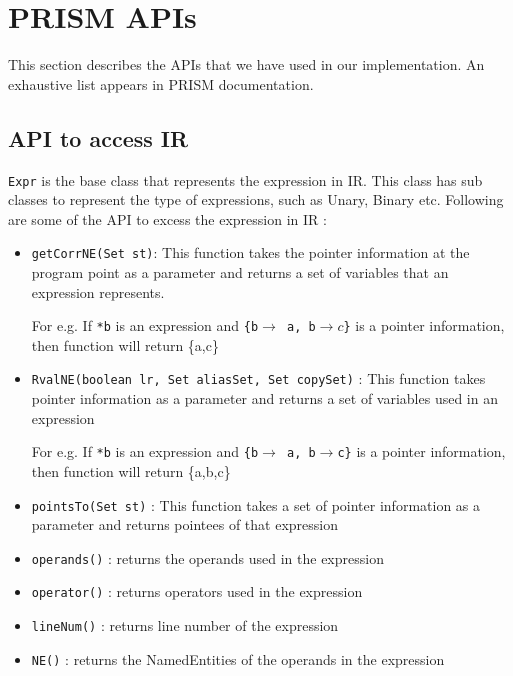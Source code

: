 \documentclass[11pt,a4paper,openright]{report}
\begin{document}
 
 
 
 
 
\chapter{PRISM APIs}\label{ap:B}

This section describes the APIs that we have used in our implementation. An exhaustive list appears in PRISM documentation.

\section{API to access IR}
\texttt{Expr} is the base class that represents the expression in IR. This class has sub classes to represent the type of expressions, such as Unary, Binary etc.
Following are some of the API to excess the expression in IR :
\begin{itemize}
 \item \texttt{getCorrNE(Set st)}: This function takes the pointer information at the program point as a parameter and returns a set of variables that an expression represents.
 
 For e.g. If \texttt{*b} is an expression and \texttt{\{b$\rightarrow$ a, b$\rightarrow c$\}} is a pointer information, then function will return \{a,c\}
 
 \item \texttt{RvalNE(boolean lr, Set aliasSet, Set copySet)} : This function takes pointer information as a parameter and returns a set of variables used in an expression
 
 For e.g. If \texttt{*b} is an expression and \texttt{\{b$\rightarrow$ a, b$\rightarrow$c\}} is a pointer information, then function will return \{a,b,c\}
 
 \item \texttt{pointsTo(Set st)} : This function takes a set of pointer information as a parameter and returns pointees of that expression
 \item \texttt{operands()} : returns the operands used in the expression
 \item \texttt{operator()} : returns operators used in the expression
 \item \texttt{lineNum()} : returns line number of the expression
 \item \texttt{NE()} : returns the NamedEntities of the operands in the expression
\end{itemize}
\end{document}

